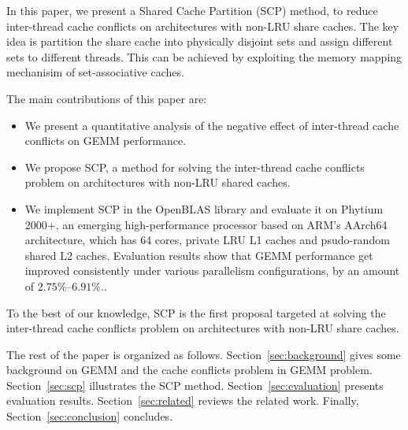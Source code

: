 In this paper, we present a Shared Cache Partition (SCP) method,
to reduce inter-thread cache conflicts on architectures with non-LRU share caches.
The key idea is partition the share cache into physically disjoint sets
and assign different sets to different threads. This can be achieved by
exploiting the memory mapping mechanisim of set-associative caches.

The main contributions of this paper are:
\begin{itemize}
\item We present a quantitative analysis of the negative effect of inter-thread cache
  conflicts on GEMM performance.
\item We propose SCP, a method for solving the inter-thread cache conflicts
  problem on architectures with non-LRU shared caches.
\item We implement SCP in the OpenBLAS library and evaluate it on Phytium 2000+,
  an emerging high-performance processor based on ARM's AArch64 architecture,
  which has 64 cores, private LRU L1 caches and psudo-random shared L2 caches.
  Evaluation results show that GEMM performance get improved consistently
  under various parallelism configurations, by an amount of $2.75\%$--$6.91\%$..
\end{itemize}

To the best of our knowledge, SCP is the first proposal targeted at
solving the inter-thread cache conflicts problem on
architectures with non-LRU share caches.

The rest of the paper is organized as follows.
Section~\ref{sec:background} gives some background on GEMM and
the cache conflicts problem in GEMM problem.
Section~\ref{sec:scp} illustrates the SCP method.
Section~\ref{sec:evaluation} presents evaluation results.
Section~\ref{sec:related} reviews the related work.
Finally, Section~\ref{sec:conclusion} concludes.
